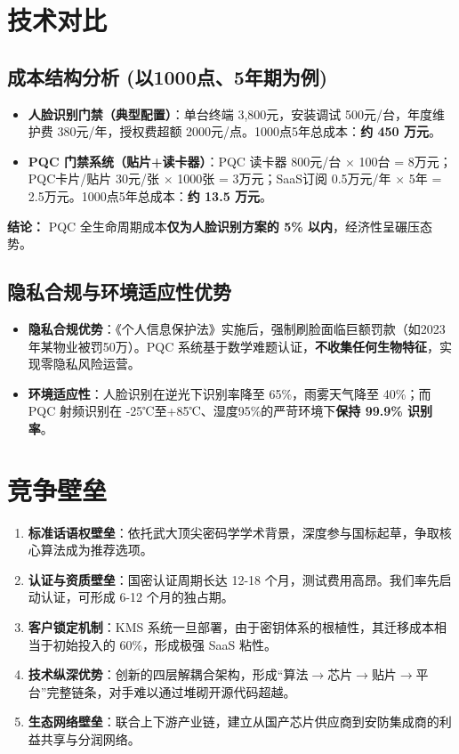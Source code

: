 \section{技术对比}

\subsection{成本结构分析 (以1000点、5年期为例)}

\begin{itemize}
	\item \textbf{人脸识别门禁（典型配置）}：单台终端 3,800元，安装调试 500元/台，年度维护费 380元/年，授权费超额 2000元/点。1000点5年总成本：\textbf{约 450 万元}。
	\item \textbf{PQC 门禁系统（贴片+读卡器）}：PQC 读卡器 800元/台 $\times$ 100台 = 8万元；PQC卡片/贴片 30元/张 $\times$ 1000张 = 3万元；SaaS订阅 0.5万元/年 $\times$ 5年 = 2.5万元。1000点5年总成本：\textbf{约 13.5 万元}。
\end{itemize}
\textbf{结论：} PQC 全生命周期成本\textbf{仅为人脸识别方案的 5\% 以内}，经济性呈碾压态势。

\subsection{隐私合规与环境适应性优势}

\begin{itemize}
	\item \textbf{隐私合规优势}：《个人信息保护法》实施后，强制刷脸面临巨额罚款（如2023年某物业被罚50万）。PQC 系统基于数学难题认证，\textbf{不收集任何生物特征}，实现零隐私风险运营。
	\item \textbf{环境适应性}：人脸识别在逆光下识别率降至 65\%，雨雾天气降至 40\%；而 PQC 射频识别在 -25℃至+85℃、湿度95\%的严苛环境下\textbf{保持 99.9\% 识别率}。
\end{itemize}

\section{竞争壁垒}

\begin{enumerate}
	\item \textbf{标准话语权壁垒}：依托武大顶尖密码学学术背景，深度参与国标起草，争取核心算法成为推荐选项。
	\item \textbf{认证与资质壁垒}：国密认证周期长达 12-18 个月，测试费用高昂。我们率先启动认证，可形成 6-12 个月的独占期。
	\item \textbf{客户锁定机制}：KMS 系统一旦部署，由于密钥体系的根植性，其迁移成本相当于初始投入的 60\%，形成极强 SaaS 粘性。
	\item \textbf{技术纵深优势}：创新的四层解耦合架构，形成“算法$\rightarrow$芯片$\rightarrow$贴片$\rightarrow$平台”完整链条，对手难以通过堆砌开源代码超越。
	\item \textbf{生态网络壁垒}：联合上下游产业链，建立从国产芯片供应商到安防集成商的利益共享与分润网络。
\end{enumerate}

